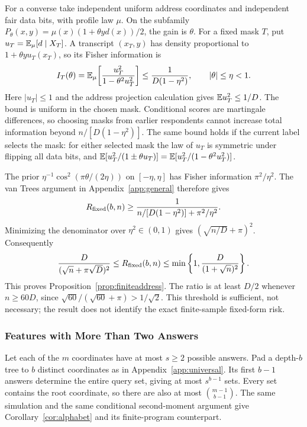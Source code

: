 For a converse take independent uniform address coordinates and independent fair data bits, with profile law $\mu$. On the subfamily $P_\theta(x,y)=\mu(x)(1+\theta y d(x))/2$, the gain is $\theta$. For a fixed mask $T$, put $u_T=\mathbb{E}_\mu[d\mid X_T]$. A transcript $(x_T,y)$ has density proportional to $1+\theta y u_T(x_T)$, so its Fisher information is
\[
 I_T(\theta)=\mathbb{E}_\mu\!\left[\frac{u_T^2}{1-\theta^2u_T^2}\right]
 \le\frac{1}{D(1-\eta^2)},\qquad |\theta|\le\eta<1.
\]
Here $|u_T|\le1$ and the address projection calculation gives $\mathbb{E} u_T^2\le1/D$. The bound is uniform in the chosen mask. Conditional scores are martingale differences, so choosing masks from earlier respondents cannot increase total information beyond $n/[D(1-\eta^2)]$. The same bound holds if the current label selects the mask: for either selected mask the law of $u_T$ is symmetric under flipping all data bits, and $\mathbb{E}[u_T^2/(1\pm\theta u_T)]=\mathbb{E}[u_T^2/(1-\theta^2u_T^2)]$.

The prior $\eta^{-1}\cos^2(\pi\theta/(2\eta))$ on $[-\eta,\eta]$ has Fisher information $\pi^2/\eta^2$. The van Trees argument in Appendix~\ref{app:general} therefore gives
\[
 R_{\rm fixed}(b,n)\ge
 \frac{1}{n/[D(1-\eta^2)]+\pi^2/\eta^2}.
\]
Minimizing the denominator over $\eta^2\in(0,1)$ gives $(\sqrt{n/D}+\pi)^2$. Consequently
\[
 \frac{D}{(\sqrt n+\pi\sqrt D)^2}
 \le R_{\rm fixed}(b,n)
 \le\min\left\{1,\frac{D}{(1+\sqrt n)^2}\right\}.
\]
This proves Proposition~\ref{prop:finiteaddress}. The ratio is at least $D/2$ whenever $n\ge60D$, since $\sqrt{60}/(\sqrt{60}+\pi)>1/\sqrt2$. This threshold is sufficient, not necessary; the result does not identify the exact finite-sample fixed-form risk.

\subsubsection{Features with More Than Two Answers}\label{app:alphabet}
Let each of the $m$ coordinates have at most $s\ge2$ possible answers. Pad a depth-$b$ tree to $b$ distinct coordinates as in Appendix~\ref{app:universal}. Its first $b-1$ answers determine the entire query set, giving at most $s^{b-1}$ sets. Every set contains the root coordinate, so there are also at most $\binom{m-1}{b-1}$. The same simulation and the same conditional second-moment argument give Corollary~\ref{cor:alphabet} and its finite-program counterpart.


